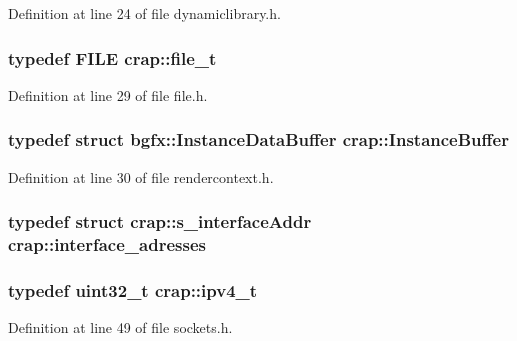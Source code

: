 Definition at line 24 of file dynamiclibrary.\+h.

\hypertarget{namespacecrap_afd3eedf00a9de7958b7dd70aafff79a4}{}
\subsubsection[{file\+\_\+t}]{\setlength{\rightskip}{0pt plus 5cm}typedef F\+I\+L\+E {\bf crap\+::file\+\_\+t}}\label{namespacecrap_afd3eedf00a9de7958b7dd70aafff79a4}


Definition at line 29 of file file.\+h.

\hypertarget{namespacecrap_a1fd4f73d2fea6a3c7aa7624b9d7d68b8}{}
\subsubsection[{Instance\+Buffer}]{\setlength{\rightskip}{0pt plus 5cm}typedef struct bgfx\+::\+Instance\+Data\+Buffer {\bf crap\+::\+Instance\+Buffer}}\label{namespacecrap_a1fd4f73d2fea6a3c7aa7624b9d7d68b8}


Definition at line 30 of file rendercontext.\+h.

\hypertarget{namespacecrap_af1dd6ce1461839e2d0d0b792fbd52e8a}{}
\subsubsection[{interface\+\_\+adresses}]{\setlength{\rightskip}{0pt plus 5cm}typedef struct {\bf crap\+::s\+\_\+interface\+Addr}
 {\bf crap\+::interface\+\_\+adresses}}\label{namespacecrap_af1dd6ce1461839e2d0d0b792fbd52e8a}
\hypertarget{namespacecrap_a9ef32279067e77955c9f269926a331ee}{}
\subsubsection[{ipv4\+\_\+t}]{\setlength{\rightskip}{0pt plus 5cm}typedef uint32\+\_\+t {\bf crap\+::ipv4\+\_\+t}}\label{namespacecrap_a9ef32279067e77955c9f269926a331ee}


Definition at line 49 of file sockets.\+h.

\hypertarget{namespacecrap_a73628169b6e7ba09cff516478c11b401}{}
